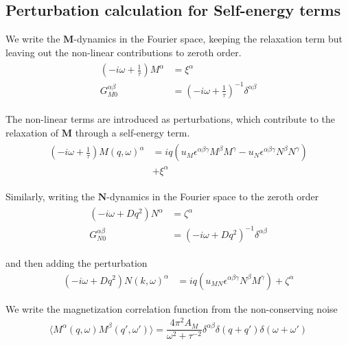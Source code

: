\documentclass[prl,aps,twocolumn,nosuperscriptaddress,bibnotes,notitlepage,nofootinbib]{revtex4-2}
\newcommand{\magg}{\mathbf{M}}
\newcommand{\stagg}{\mathbf{N}}
\begin{document}
\subsection*{Perturbation calculation for Self-energy terms}
We write the $\magg$-dynamics in the Fourier space, keeping the relaxation term but leaving out the non-linear contributions to zeroth order. 
\begin{align}
    \begin{split}
    (-i \omega  +\frac{1}{\tau}) M^{\alpha} &=  \xi^{\alpha} \\
    G_{M0}^{\alpha \beta} &= (-i \omega  +\frac{1}{\tau})^{-1} \delta^{\alpha \beta}
    \end{split}
    \label{eqn:M0propg}
\end{align}

The non-linear terms are introduced as perturbations, which contribute to the relaxation of $\magg$ through a self-energy term.
\begin{align}
    \begin{split}
    (-i \omega  +\frac{1}{\tau}) M(q, \omega)^{\alpha} &=  iq (u_M \epsilon^{\alpha \beta \gamma} M^{\beta} M^{\gamma} - u_N \epsilon^{\alpha \beta \gamma} N^{\beta} N^{\gamma})\\
    & +\xi^{\alpha}
    \end{split}
    \label{eqn:M1propg}
\end{align}

Similarly, writing the $\stagg$-dynamics in the Fourier space to the zeroth order
\begin{align}
    \begin{split}
    (-i \omega + Dq^2) N^{\alpha} &=  \zeta^{\alpha} \\
    G_{N0}^{\alpha \beta} &= (-i \omega  +Dq^2)^{-1} \delta^{\alpha \beta}
    \end{split}
    \label{eqn:N0propg}
\end{align}

and then adding the perturbation
\begin{align}
    (-i \omega  +Dq^2) N(k, \omega)^{\alpha} &=  iq (u_{MN} \epsilon^{\alpha \beta \gamma} N^{\beta} M^{\gamma} )+ \zeta^{\alpha}
    \label{eqn:N1propg}
\end{align}

We write the magnetization correlation function from the non-conserving noise
\begin{align}
    \label{eqn:magg_correlation_ft}
    \langle M^{\alpha} (q, \omega) M^{\beta} (q', \omega') \rangle =  \dfrac{4 \pi^2 A_M}{\omega^2 + \tau^{-2}} \delta^{\alpha \beta} \delta(q+q')  \delta (\omega + \omega')
\end{align}
\end{document}
